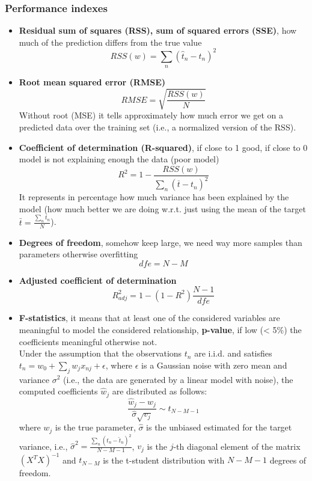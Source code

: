 \subsubsection{Performance indexes}
    \begin{itemize}
        \item \textbf{Residual sum of squares (RSS), sum of squared errors (SSE)}, how much of the prediction differs from the true value
        $$RSS(w)=\sum_n(\hat{t}_n-t_n)^2$$
        \item \textbf{Root mean squared error (RMSE)}
        $$RMSE=\sqrt{\frac{RSS(w)}{N}}$$
        Without root (MSE) it tells approximately how much error we get on a predicted data over the training set (i.e., a normalized version of the RSS).
        \item \textbf{Coefficient of determination (R-squared)}, if close to 1 good, if close to 0 model is not explaining enough the data (poor model)
        $$R^2=1-\frac{RSS(w)}{\sum_n(\overline{t}-t_n)^2}$$
        It represents in percentage how much variance has been explained by the model
        (how much better we are doing w.r.t. just using the mean of the target $\bar{t} = \frac{\sum_n t_n}{N}$).
        \item \textbf{Degrees of freedom}, somehow keep large, we need way more samples than parameters otherwise overfitting
        $$dfe=N-M$$
        \item \textbf{Adjusted coefficient of determination}
        $$R^2_{adj}=1-(1-R^2)\frac{N-1}{dfe}$$
        \item \textbf{F-statistics}, it means that at least one of the considered variables are meaningful to model the considered relationship, \textbf{p-value}, if low (< 5\%) the coefficients meaningful otherwise not.\\
        Under the assumption that the observations $t_n$ are i.i.d. and satisfies $t_n = w_0 + \sum_j w_j x_{nj} + \epsilon$, where $\epsilon$ is a Gaussian noise with zero mean and variance $\sigma^2$ (i.e., the data are generated by a linear model with noise), the computed coefficients $\hat{w}_j$ are distributed as follows:
        \begin{equation*}
            \frac{\hat{w}_j - w_j}{\hat{\sigma} \sqrt{v_j}} \sim t_{N - M -1}
        \end{equation*}
        where $w_j$ is the true parameter, $\hat{\sigma}$ is the unbiased estimated for the target variance, i.e., $\hat{\sigma}^2 = \frac{\sum_n (t_n - \hat{t}_n)^2}{N - M - 1}$, $v_j$ is the $j$-th diagonal element of the matrix $(X^T X)^{-1}$ and $t_{N - M}$ is the t-student distribution with $N - M - 1$ degrees of freedom.\\

\end{itemize}
